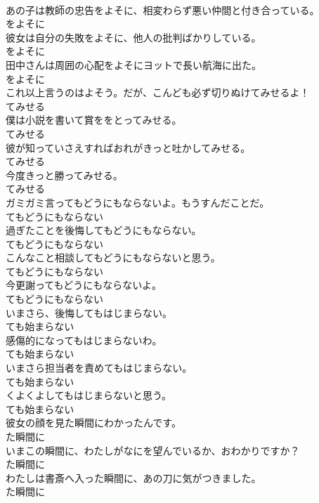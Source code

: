 \documentclass[8pt]{extreport}
\begin{document}
\begin{CJK}{UTF8}{min}
\\	あの子は教師の忠告をよそに、相変わらず悪い仲間と付き合っている。	
\\	をよそに
\\	彼女は自分の失敗をよそに、他人の批判ばかりしている。	
\\	をよそに
\\	田中さんは周囲の心配をよそにヨットで長い航海に出た。	
\\	をよそに
\\	これ以上言うのはよそう。だが、こんども必ず切りぬけてみせるよ！	
\\	てみせる
\\	僕は小説を書いて賞ををとってみせる。	
\\	てみせる
\\	彼が知っていさえすればおれがきっと吐かしてみせる。	
\\	てみせる
\\	今度きっと勝ってみせる。	
\\	てみせる
\\	ガミガミ言ってもどうにもならないよ。もうすんだことだ。	
\\	てもどうにもならない
\\	過ぎたことを後悔してもどうにもならない。	
\\	てもどうにもならない
\\	こんなこと相談してもどうにもならないと思う。	
\\	てもどうにもならない
\\	今更謝ってもどうにもならないよ。	
\\	てもどうにもならない
\\	いまさら、後悔してもはじまらない。	
\\	ても始まらない
\\	感傷的になってもはじまらないわ。	
\\	ても始まらない
\\	いまさら担当者を責めてもはじまらない。	
\\	ても始まらない
\\	くよくよしてもはじまらないと思う。	
\\	ても始まらない
\\	彼女の顔を見た瞬間にわかったんです。	
\\	た瞬間に
\\	いまこの瞬間に、わたしがなにを望んでいるか、おわかりですか？	
\\	た瞬間に
\\	わたしは書斎へ入った瞬間に、あの刀に気がつきました。	
\\	た瞬間に

\end{CJK}
\end{document}
